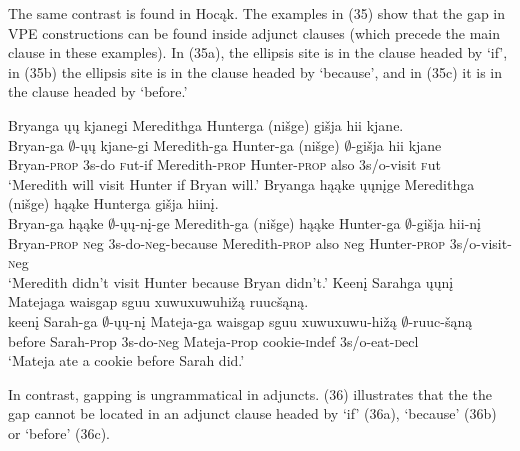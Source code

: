 \documentclass[output=paper]{LSP/langsci}
\begin{document}
The same contrast is found in Hocąk. The examples in (35) show that the gap in VPE constructions can be found inside adjunct clauses (which precede the main clause in these examples). In (35a), the ellipsis site is in the clause headed by `if', in (35b) the ellipsis site is in the clause headed by `because', and in (35c) it is in the clause headed by `before.'

\begin{exe}
\ex
\begin{xlist}
\ex
\glll Bryanga ųų kjanegi Meredithga Hunterga (nišge) {gišja hii} kjane.\\
Bryan-ga $\emptyset$-ųų kjane-gi Meredith-ga Hunter-ga (nišge) $\emptyset$-{gišja hii} kjane\\
Bryan-\textsc{prop} {\textsc 3s}-do {\textsc fut}-if Meredith-\textsc{prop} Hunter-\textsc{prop} also {\textsc 3s/o}-visit {\textsc fut}\\
\trans `Meredith will visit Hunter if Bryan will.'
\ex
\glll Bryanga hąąke ųųnįge Meredithga (nišge) hąąke Hunterga {gišja hiinį}.\\
Bryan-ga hąąke $\emptyset$-ųų-nį-ge Meredith-ga (nišge) hąąke Hunter-ga $\emptyset$-{gišja hii-nį}\\
Bryan-\textsc{prop} {\textsc neg} {\textsc 3s}-do-{\textsc neg}-because Meredith-\textsc{prop} also {\textsc neg} Hunter-\textsc{prop} {\textsc 3s/o}-visit-{\textsc neg}\\
\trans `Meredith didn't visit Hunter because Bryan didn't.'
\ex
\glll Keenį Sarahga ųųnį Matejaga {waisgap sguu xuwuxuwuhižą} ruucšąną.\\
keenį Sarah-ga $\emptyset$-ųų-nį Mateja-ga {waisgap sguu xuwuxuwu-hižą} $\emptyset$-ruuc-šąną\\
before Sarah-{\textsc prop} {\textsc 3s}-do-{\textsc neg} Mateja-{\textsc prop} cookie-{\textsc indef} {\textsc 3s/o}-eat-{\textsc decl}\\
\trans `Mateja ate a cookie before Sarah did.'
\end{xlist}
\end{exe}

In contrast, gapping is ungrammatical in adjuncts. (36) illustrates that the the gap cannot be located in an adjunct clause headed by `if' (36a), `because' (36b) or `before' (36c).
\end{document}
